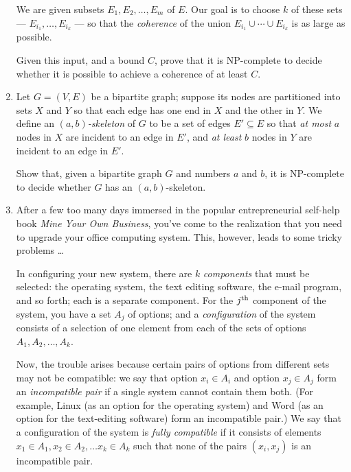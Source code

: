 \documentclass[12pt]{article}
\begin{document}
\begin{enumerate}
We are given subsets $E_1, E_2, \ldots, E_m$ of $E$.
Our goal is to choose $k$ of these sets ---
$E_{i_1}, \ldots, E_{i_k}$ --- so that the
{\em coherence} of the union
$E_{i_1} \cup \cdots \cup E_{i_k}$ is as large as possible.

Given this input, and a bound $C$, prove that it is
NP-complete to decide whether it is possible to achieve
a coherence of at least $C$.


\item

Let $G = (V,E)$ be a bipartite graph; suppose its nodes are
partitioned into sets $X$ and $Y$ so that each edge has one end
in $X$ and the other in $Y$.  We define an {\em $(a,b)$-skeleton}
of $G$ to be a set of edges $E' \subseteq E$ so that {\em at most}
$a$ nodes in $X$ are incident to an edge in $E'$, and {\em at least}
$b$ nodes in $Y$ are incident to an edge in $E'$.

Show that, given a bipartite graph $G$ and numbers $a$ and $b$,
it is NP-complete to decide whether $G$ has an $(a,b)$-skeleton.



\item

After a few too many days immersed in the popular
entrepreneurial self-help book {\em Mine Your Own Business},
you've come to the realization that you need
to upgrade your office computing system.
This, however, leads to some tricky problems \ldots

In configuring your new system, there are $k$
{\em components} that must be selected:
the operating system, the text editing software,
the e-mail program, and so forth; each is a separate component.
For the $j^{\rm th}$ component of the system,
you have a set $A_j$ of options;
and a {\em configuration} of the system consists
of a selection of one element from each of the
sets of options $A_1, A_2, \ldots, A_k$.

Now, the trouble arises because
certain pairs of options from different sets
may not be compatible:
we say that option $x_i \in A_i$ and option $x_j \in A_j$
form an {\em incompatible pair} if a single system
cannot contain them both.
(For example, Linux (as an option for the operating system)
and Word (as an option for the text-editing software)
form an incompatible pair.)
We say that a configuration of the system is
{\em fully compatible} if it consists of elements
$x_1 \in A_1, x_2 \in A_2, \ldots x_k \in A_k$
such that none of the pairs $(x_i,x_j)$ is
an incompatible pair.


\end{enumerate}
\end{document}
